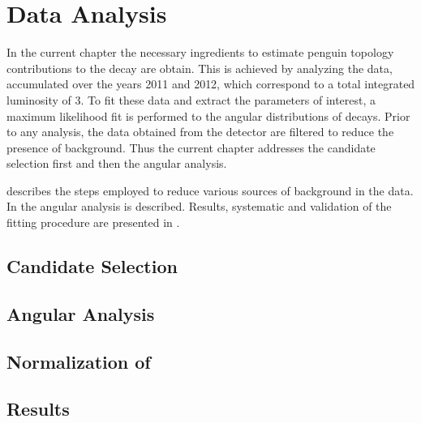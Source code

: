 \chapter{Data Analysis}
\label{Data_Analysis}

In the current chapter the necessary ingredients to estimate penguin topology contributions to the \BsJpsiPhi 
decay are obtain. This is achieved by analyzing the \runone \lhcb data, accumulated over the years 2011 and 2012,
which correspond to a total integrated luminosity of 3\invfb. To fit these data and extract the parameters of 
interest, a maximum likelihood fit is performed to the angular distributions of \BsJpsiKst decays.
Prior to any analysis, the data obtained from the detector are filtered to reduce the presence of
background. Thus the current chapter addresses the \Bs candidate selection first and then the angular analysis.

 describes the steps employed to reduce various sources of background in the data. 
In  the angular analysis is described. Results, systematic and validation of 
the fitting procedure are presented in .    

\section{Candidate Selection}
\label{Event_Selection}


\section{Angular Analysis}
\label{Angular_Analysis}


\section{Normalization of \BsJpsiKpi}
\label{Normalization}


\section{Results}
\label{Results}

